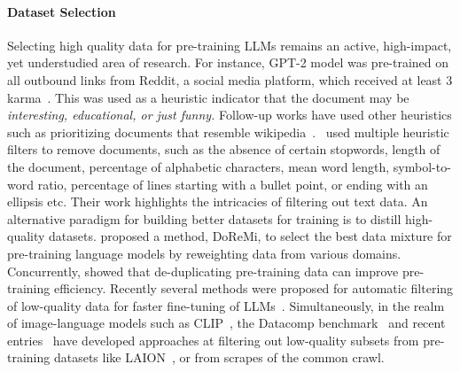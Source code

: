 \documentclass[table]{article}
\begin{document}
\paragraph{Dataset Selection}
Selecting high quality data for pre-training LLMs remains an active, high-impact, yet understudied area of research. For instance,
 GPT-2 model was pre-trained on all outbound links from Reddit, a social media platform, which received at least 3 karma~\citep{brown2020language}. This was used as a heuristic indicator that the document may be \emph{interesting, educational, or just funny.}
 Follow-up works have used other heuristics such as prioritizing documents that resemble wikipedia~\citep{gururangan-etal-2022-whose}.~\citet{rae2021scaling}
used multiple heuristic filters to remove documents, such as the absence of certain stopwords, length of the document, percentage of alphabetic characters, 
 mean word length, 
  symbol-to-word ratio, percentage of lines starting with a bullet point, or ending with an ellipsis etc. Their work highlights the intricacies of filtering out text data.
An alternative paradigm for building better datasets for training is to distill high-quality datasets.  \citet{xie2023doremi} proposed a method, DoReMi, to select the best data mixture for pre-training language models by reweighting data from various domains.
Concurrently, \citet{Abbas2023SemDeDupDL} showed that de-duplicating pre-training data can improve pre-training efficiency.
Recently several methods were proposed for automatic filtering of low-quality data for faster fine-tuning of LLMs~\citep{chen2023alpagasus,solaiman2021process,zhou2023lima}. Simultaneously, in the realm of image-language models such as CLIP~\citep{radford2021learning}, the Datacomp benchmark~\citep{gadre2023datacomp} and recent entries~\citep{maini2023t,yu2023devil} have developed approaches at filtering out low-quality subsets from pre-training datasets like LAION~\citep{schuhmann2022laion}, or from scrapes of the common crawl.
\end{document}
